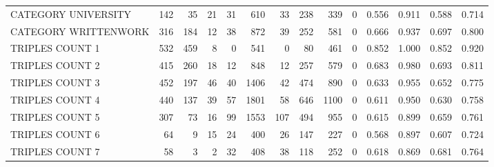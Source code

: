 \begin{tabular}{lrrrrrrrrrllll}
 CATEGORY UNIVERSITY      &             142 &            35 &              21 &              31 &             610 &   33 &  238 &  339 &    0 & 0.556 & 0.911 & 0.588 & 0.714 \\
 CATEGORY WRITTENWORK     &             316 &           184 &              12 &              38 &             872 &   39 &  252 &  581 &    0 & 0.666 & 0.937 & 0.697 & 0.800 \\
 TRIPLES COUNT 1          &             532 &           459 &               8 &               0 &             541 &    0 &   80 &  461 &    0 & 0.852 & 1.000 & 0.852 & 0.920 \\
 TRIPLES COUNT 2          &             415 &           260 &              18 &              12 &             848 &   12 &  257 &  579 &    0 & 0.683 & 0.980 & 0.693 & 0.811 \\
 TRIPLES COUNT 3          &             452 &           197 &              46 &              40 &            1406 &   42 &  474 &  890 &    0 & 0.633 & 0.955 & 0.652 & 0.775 \\
 TRIPLES COUNT 4          &             440 &           137 &              39 &              57 &            1801 &   58 &  646 & 1100 &    0 & 0.611 & 0.950 & 0.630 & 0.758 \\
 TRIPLES COUNT 5          &             307 &            73 &              16 &              99 &            1553 &  107 &  494 &  955 &    0 & 0.615 & 0.899 & 0.659 & 0.761 \\
 TRIPLES COUNT 6          &              64 &             9 &              15 &              24 &             400 &   26 &  147 &  227 &    0 & 0.568 & 0.897 & 0.607 & 0.724 \\
 TRIPLES COUNT 7          &              58 &             3 &               2 &              32 &             408 &   38 &  118 &  252 &    0 & 0.618 & 0.869 & 0.681 & 0.764 \\
\hline
\end{tabular}